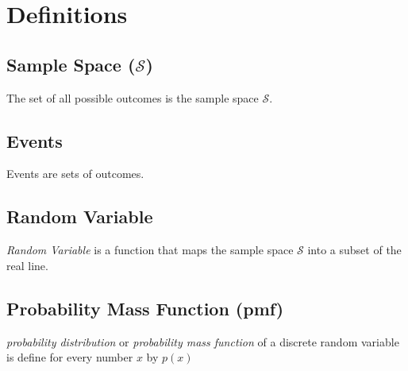 \section{Definitions}

\subsection{Sample Space ($\mathcal{S}$)}
	The set of all possible outcomes is the sample space $\mathcal{S}$.

\subsection{Events}
	Events are sets of outcomes. 

\subsection{Random Variable}
	\emph{Random Variable} is a function that maps the sample space $\mathcal{S}$ into a subset of the real line.

\subsection{Probability Mass Function (pmf)}
	\emph{probability distribution} or \emph{probability mass function} of a discrete random variable is define for every number $x$ by $p(x)$
